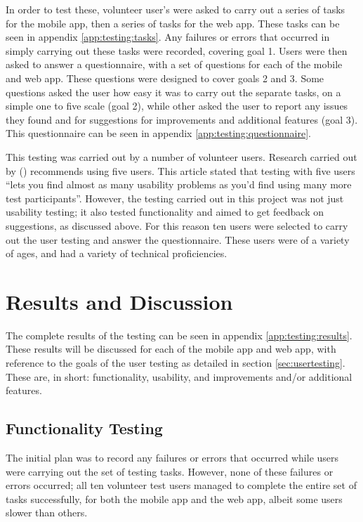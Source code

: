 \documentclass[11pt,openright,a4paper]{report}
\begin{document}
In order to test these, volunteer user's were asked to carry out a series of tasks for the mobile app, then a series of tasks for the web app. These tasks can be seen in appendix \ref{app:testing:tasks}. Any failures or errors that occurred in simply carrying out these tasks were recorded, covering goal 1. Users were then asked to answer a questionnaire, with a set of questions for each of the mobile and web app. These questions were designed to cover goals 2 and 3. Some questions asked the user how easy it was to carry out the separate tasks, on a simple one to five scale (goal 2), while other asked the user to report any issues they found and for suggestions for improvements and additional features (goal 3). This questionnaire can be seen in appendix \ref{app:testing:questionnaire}.

This testing was carried out by a number of volunteer users. Research carried out by \citeauthor{nielsenfiveusers} (\citeyear{nielsenfiveusers}) recommends using five users. This article stated that testing with five users \enquote{lets you find almost as many usability problems as you'd find using many more test participants}. However, the testing carried out in this project was not just usability testing; it also tested functionality and aimed to get feedback on suggestions, as discussed above. For this reason ten users were selected to carry out the user testing and answer the questionnaire. These users were of a variety of ages, and had a variety of technical proficiencies.

\chapter{Results and Discussion} \label{chap:results}
The complete results of the testing can be seen in appendix \ref{app:testing:results}. These results will be discussed for each of the mobile app and web app, with reference to the goals of the user testing as detailed in section \ref{sec:usertesting}. These are, in short: functionality, usability, and improvements and/or additional features.

\section{Functionality Testing}
The initial plan was to record any failures or errors that occurred while users were carrying out the set of testing tasks. However, none of these failures or errors occurred; all ten volunteer test users managed to complete the entire set of tasks successfully, for both the mobile app and the web app, albeit some users slower than others.
\end{document}
